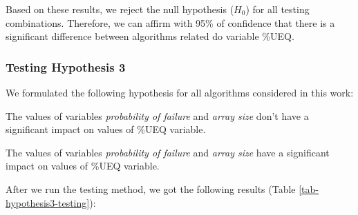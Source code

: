 Based on these results, we reject the null hypothesis ($H_{0}$) for all testing combinations. Therefore, we can affirm with 95\% of confidence that there is a significant difference between algorithms related do variable \%UEQ.

\subsubsection{Testing Hypothesis 3}

We formulated the following hypothesis for all algorithms considered in this work:

\setcounter{hyp}{-1}
\begin{hyp} \label{hyp:a} The values of variables \textit{probability of failure} and \textit{array size} don't have a significant impact on values of \%UEQ variable.\end{hyp}
\begin{hyp} \label{hyp:b} The values of variables \textit{probability of failure} and \textit{array size} have a significant impact on values of \%UEQ variable.\end{hyp}

After we run the testing method, we got the following results (Table \ref{tab-hypothesis3-testing}):

